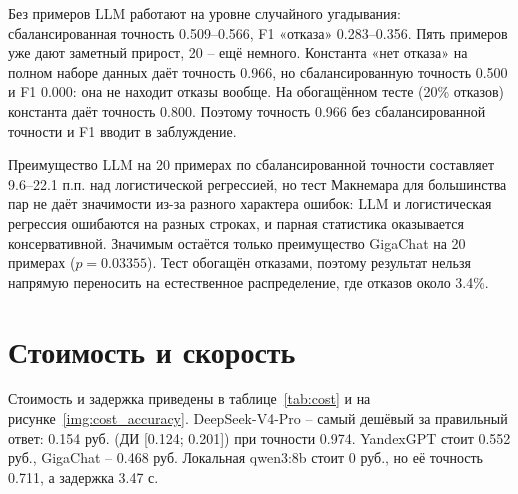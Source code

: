 \documentclass{bmstu}
\begin{document}

Без примеров LLM работают на уровне случайного угадывания: сбалансированная точность 0.509--0.566, F1 «отказа» 0.283--0.356. Пять примеров уже дают заметный прирост, 20 -- ещё немного. Константа «нет отказа» на полном наборе данных даёт точность 0.966, но сбалансированную точность 0.500 и F1 0.000: она не находит отказы вообще. На обогащённом тесте (20\% отказов) константа даёт точность 0.800. Поэтому точность 0.966 без сбалансированной точности и F1 вводит в заблуждение.

Преимущество LLM на 20 примерах по сбалансированной точности составляет 9.6--22.1 п.п. над логистической регрессией, но тест Макнемара для большинства пар не даёт значимости из-за разного характера ошибок: LLM и логистическая регрессия ошибаются на разных строках, и парная статистика оказывается консервативной. Значимым остаётся только преимущество GigaChat на 20 примерах ($p=0.03355$). Тест обогащён отказами, поэтому результат нельзя напрямую переносить на естественное распределение, где отказов около 3.4\%.

\section{Стоимость и скорость}
Стоимость и задержка приведены в таблице~\ref{tab:cost} и на рисунке~\ref{img:cost_accuracy}. DeepSeek-V4-Pro -- самый дешёвый за правильный ответ: 0.154 руб. (ДИ [0.124; 0.201]) при точности 0.974. YandexGPT стоит 0.552 руб., GigaChat -- 0.468 руб. Локальная qwen3:8b стоит 0 руб., но её точность 0.711, а задержка 3.47 с.

\begin{table}[htbp]
\centering
\caption{Стоимость и скорость основного прогона}
\label{tab:cost}
\setlength{\tabcolsep}{2pt}
\vspace{-10pt}
\end{table}
\end{document}
